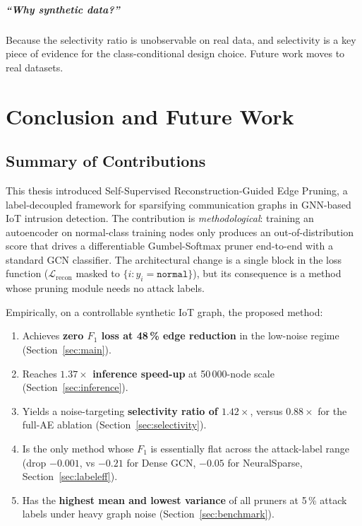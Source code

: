 \documentclass[11pt,a4paper]{report}
\theoremstyle{definition}
\theoremstyle{remark}
\begin{document}
\paragraph{``Why synthetic data?''}
Because the selectivity ratio is unobservable on real data, and
selectivity is a key piece of evidence for the class-conditional design
choice. Future work moves to real datasets.

\chapter{Conclusion and Future Work}
\label{ch:conclusion}

\section{Summary of Contributions}

This thesis introduced Self-Supervised Reconstruction-Guided Edge
Pruning, a label-decoupled framework for sparsifying communication
graphs in GNN-based IoT intrusion detection. The contribution is
\emph{methodological}: training an autoencoder on normal-class training
nodes only produces an out-of-distribution score that drives a
differentiable Gumbel-Softmax pruner end-to-end with a standard GCN
classifier. The architectural change is a single block in the loss
function ($\mathcal{L}_{\text{recon}}$ masked to $\{i: y_i=\texttt{normal}\}$),
but its consequence is a method whose pruning module needs no attack
labels.

Empirically, on a controllable synthetic IoT graph, the proposed method:
\begin{enumerate}[leftmargin=1.6em]
\item Achieves \textbf{zero $F_1$ loss at 48\,\% edge reduction} in
the low-noise regime (Section~\ref{sec:main}).
\item Reaches \textbf{$1.37\times$ inference speed-up} at 50\,000-node
scale (Section~\ref{sec:inference}).
\item Yields a noise-targeting \textbf{selectivity ratio of
$1.42\times$}, versus $0.88\times$ for the full-AE ablation
(Section~\ref{sec:selectivity}).
\item Is the only method whose $F_1$ is essentially flat across the
attack-label range (drop $-0.001$, vs $-0.21$ for Dense GCN, $-0.05$
for NeuralSparse, Section~\ref{sec:labeleff}).
\item Has the \textbf{highest mean and lowest variance} of all pruners
at 5\,\% attack labels under heavy graph noise
(Section~\ref{sec:benchmark}).
\end{enumerate}
\end{document}
